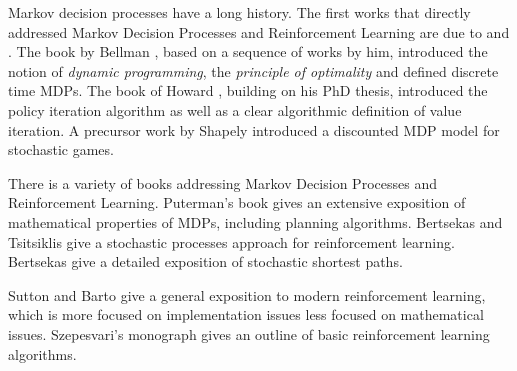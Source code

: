 Markov decision processes have a long history. The first works that directly addressed Markov Decision Processes and Reinforcement Learning are due to \cite{Bellman:DynamicProgramming} and \cite{Howard1960}. The book by Bellman \cite{Bellman:DynamicProgramming}, based on a sequence of works by him, introduced the notion of \emph{dynamic programming}, the \emph{principle of optimality} and defined discrete time MDPs. The book of Howard \cite{Howard1960}, building on his PhD thesis, introduced the policy iteration algorithm as well as a clear algorithmic definition of value iteration. A precursor work by Shapely \cite{Shapley53} introduced a discounted MDP model for stochastic games.

There is a variety of books addressing Markov Decision Processes and Reinforcement Learning. Puterman's book \cite{puterman2014markov} gives an extensive exposition of mathematical properties of MDPs, including planning algorithms. Bertsekas and Tsitsiklis \cite{BertsekasTsitsiklis96} give a stochastic processes approach for reinforcement learning. Bertsekas \cite{Bertsekas05} give a detailed exposition of stochastic shortest paths.

Sutton and Barto \cite{SuttonB98} give a general exposition to modern reinforcement learning, which is more focused on implementation issues less focused on mathematical issues. Szepesvari's monograph \cite{Szepesvari} gives an outline of basic reinforcement learning algorithms.




